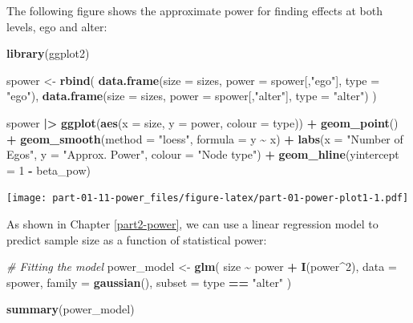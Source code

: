 \documentclass[
]{book}
\newenvironment{Shaded}{\begin{snugshade}}{\end{snugshade}}
\newcommand{\AttributeTok}[1]{\textcolor[rgb]{0.13,0.29,0.53}{#1}}
\newcommand{\CommentTok}[1]{\textcolor[rgb]{0.56,0.35,0.01}{\textit{#1}}}
\newcommand{\DecValTok}[1]{\textcolor[rgb]{0.00,0.00,0.81}{#1}}
\newcommand{\FunctionTok}[1]{\textcolor[rgb]{0.13,0.29,0.53}{\textbf{#1}}}
\newcommand{\NormalTok}[1]{#1}
\newcommand{\OtherTok}[1]{\textcolor[rgb]{0.56,0.35,0.01}{#1}}
\newcommand{\SpecialCharTok}[1]{\textcolor[rgb]{0.81,0.36,0.00}{\textbf{#1}}}
\newcommand{\StringTok}[1]{\textcolor[rgb]{0.31,0.60,0.02}{#1}}
\begin{document}
The following figure shows the approximate power for finding effects at both levels, ego and alter:

\begin{Shaded}
\begin{Highlighting}[]
\FunctionTok{library}\NormalTok{(ggplot2)}

\NormalTok{spower }\OtherTok{\textless{}{-}} \FunctionTok{rbind}\NormalTok{(}
  \FunctionTok{data.frame}\NormalTok{(}\AttributeTok{size =}\NormalTok{ sizes, }\AttributeTok{power =}\NormalTok{ spower[,}\StringTok{"ego"}\NormalTok{], }\AttributeTok{type =}  \StringTok{"ego"}\NormalTok{),}
  \FunctionTok{data.frame}\NormalTok{(}\AttributeTok{size =}\NormalTok{ sizes, }\AttributeTok{power =}\NormalTok{ spower[,}\StringTok{"alter"}\NormalTok{], }\AttributeTok{type =}  \StringTok{"alter"}\NormalTok{)}
\NormalTok{)}

\NormalTok{spower }\SpecialCharTok{|\textgreater{}}
  \FunctionTok{ggplot}\NormalTok{(}\FunctionTok{aes}\NormalTok{(}\AttributeTok{x =}\NormalTok{ size, }\AttributeTok{y =}\NormalTok{ power, }\AttributeTok{colour =}\NormalTok{ type)) }\SpecialCharTok{+}
  \FunctionTok{geom\_point}\NormalTok{() }\SpecialCharTok{+}
  \FunctionTok{geom\_smooth}\NormalTok{(}\AttributeTok{method =} \StringTok{"loess"}\NormalTok{, }\AttributeTok{formula =}\NormalTok{ y }\SpecialCharTok{\textasciitilde{}}\NormalTok{ x) }\SpecialCharTok{+}
  \FunctionTok{labs}\NormalTok{(}\AttributeTok{x =} \StringTok{"Number of Egos"}\NormalTok{, }\AttributeTok{y =} \StringTok{"Approx. Power"}\NormalTok{, }\AttributeTok{colour =} \StringTok{"Node type"}\NormalTok{) }\SpecialCharTok{+}
  \FunctionTok{geom\_hline}\NormalTok{(}\AttributeTok{yintercept =} \DecValTok{1} \SpecialCharTok{{-}}\NormalTok{ beta\_pow)}
\end{Highlighting}
\end{Shaded}

\texttt{[image: part-01-11-power\_files/figure-latex/part-01-power-plot1-1.pdf]}

As shown in Chapter \ref{part2-power}, we can use a linear regression model to predict sample size as a function of statistical power:

\begin{Shaded}
\begin{Highlighting}[]
\CommentTok{\# Fitting the model}
\NormalTok{power\_model }\OtherTok{\textless{}{-}} \FunctionTok{glm}\NormalTok{(}
\NormalTok{  size }\SpecialCharTok{\textasciitilde{}}\NormalTok{ power }\SpecialCharTok{+} \FunctionTok{I}\NormalTok{(power}\SpecialCharTok{\^{}}\DecValTok{2}\NormalTok{),}
  \AttributeTok{data =}\NormalTok{ spower, }\AttributeTok{family =} \FunctionTok{gaussian}\NormalTok{(), }\AttributeTok{subset =}\NormalTok{ type }\SpecialCharTok{==} \StringTok{"alter"}
\NormalTok{)}

\FunctionTok{summary}\NormalTok{(power\_model)}
\end{Highlighting}
\end{Shaded}
\end{document}
